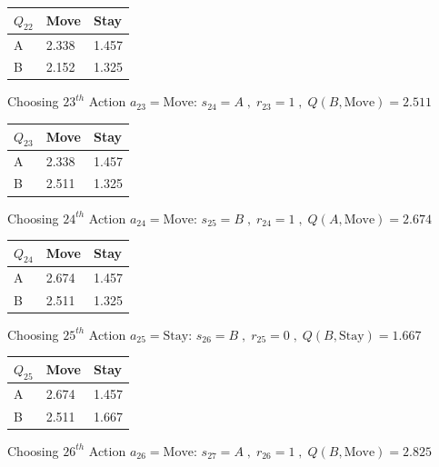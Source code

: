 \documentclass[a4paper]{article}
\theoremstyle{definition}
\newenvironment{soln}{
    \leavevmode\color{blue}\ignorespaces
}{}
\begin{document}
\begin{enumerate}
\begin{soln}
\begin{center}
\begin{tabular}{ | m{5em} | m{5em}| m{5em} |}
            \hline
            $Q_{22}$ & Move & Stay \\ 
            \hline
            A & 2.338 & 1.457  \\
            \hline
            B & 2.152 & 1.325 \\ 
            \hline
            \end{tabular}
        \end{center}
Choosing $23^{th}$ Action $a_{23} = \text{Move}$: $s_{24}=A\;,\;r_{23}=1\;,\;Q(B,\text{Move}) = 2.511$
        \begin{center}
            \begin{tabular}{ | m{5em} | m{5em}| m{5em} |} 
            \hline
            $Q_{23}$ & Move & Stay \\ 
            \hline
            A & 2.338 & 1.457  \\
            \hline
            B & 2.511 & 1.325 \\ 
            \hline
            \end{tabular}
        \end{center}
Choosing $24^{th}$ Action $a_{24} = \text{Move}$: $s_{25}=B\;,\;r_{24}=1\;,\;Q(A,\text{Move}) = 2.674$
        \begin{center}
            \begin{tabular}{ | m{5em} | m{5em}| m{5em} |} 
            \hline
            $Q_{24}$ & Move & Stay \\ 
            \hline
            A & 2.674 & 1.457  \\
            \hline
            B & 2.511 & 1.325 \\ 
            \hline
            \end{tabular}
        \end{center}
Choosing $25^{th}$ Action $a_{25} = \text{Stay}$: $s_{26}=B\;,\;r_{25}=0\;,\;Q(B,\text{Stay}) = 1.667$
        \begin{center}
            \begin{tabular}{ | m{5em} | m{5em}| m{5em} |} 
            \hline
            $Q_{25}$ & Move & Stay \\ 
            \hline
            A & 2.674 & 1.457  \\
            \hline
            B & 2.511 & 1.667 \\ 
            \hline
            \end{tabular}
        \end{center}
Choosing $26^{th}$ Action $a_{26} = \text{Move}$: $s_{27}=A\;,\;r_{26}=1\;,\;Q(B,\text{Move}) = 2.825$

\end{soln}
\end{enumerate}
\end{document}
